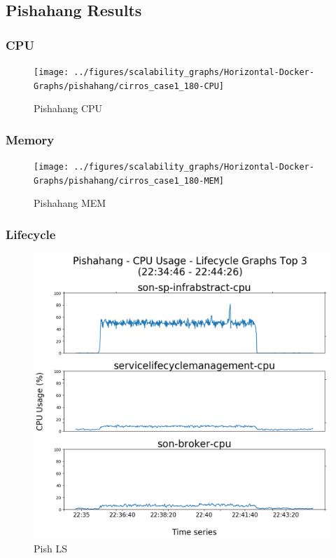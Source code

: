 \subsection{Pishahang Results}

\subsubsection{CPU}

\begin{figure}[h]
	\centering
	\texttt{[image: ../figures/scalability\_graphs/Horizontal-Docker-Graphs/pishahang/cirros\_case1\_180-CPU]}
	\caption{Pishahang CPU}
	\label{fig:pishcirroscase1180-cpu}
\end{figure}

\subsubsection{Memory}

\begin{figure}[h]
	\centering
	\texttt{[image: ../figures/scalability\_graphs/Horizontal-Docker-Graphs/pishahang/cirros\_case1\_180-MEM]}
	\caption{Pishahang MEM}
	\label{fig:pishcirroscase1180-mem}
\end{figure}


\subsubsection{Lifecycle}

\begin{figure}[h]
	\centering
	\includegraphics[width=0.7\linewidth]{figures/scalability_graphs/Lifecycle-Graphs-Top-3/Pishahang-TOP-3-Lifecycle}
	\caption{Pish LS}
	\label{fig:pishahang-top-3-lifecycle}
\end{figure}
